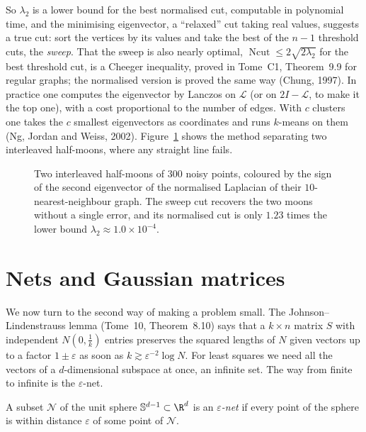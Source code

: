 So $\lambda_2$ is a lower bound for the best normalised cut, computable in polynomial time, and the minimising eigenvector, a ``relaxed'' cut
taking real values, suggests a true cut: sort the vertices by its values and take the best of the $n-1$ threshold cuts, the \emph{sweep}. That the sweep is
also nearly optimal, $\operatorname{Ncut}\le2\sqrt{2\lambda_2}$ for the best threshold cut, is a Cheeger inequality, proved in Tome~C1, Theorem~9.9 for regular graphs; the normalised version is
proved the same way (Chung, 1997). In practice one computes the eigenvector by Lanczos on $\mathcal L$ (or on $2I-\mathcal L$, to make it the top one), with a cost
proportional to the number of edges. With $c$ clusters one takes the $c$ smallest eigenvectors as coordinates and runs $k$-means on them (Ng, Jordan and Weiss, 2002).
Figure~\ref{fig:moons} shows the method separating two interleaved half-moons, where any straight line fails.

\begin{figure}[ht]
\centering
{}
\caption{Two interleaved half-moons of $300$ noisy points, coloured by the sign of the second eigenvector of the normalised Laplacian of their $10$-nearest-neighbour
graph. The sweep cut recovers the two moons without a single error, and its normalised cut is only $1.23$ times the lower bound $\lambda_2\approx1.0\times10^{-4}$.}
\label{fig:moons}
\end{figure}

\section{Nets and Gaussian matrices}\label{sec:nets}

We now turn to the second way of making a problem small. The Johnson--Lindenstrauss lemma (Tome~10, Theorem~8.10) says that a $k\times n$ matrix $S$ with independent
$N(0,\frac1k)$ entries preserves the squared lengths of $N$ given vectors up to a factor $1\pm\varepsilon$ as soon as $k\gtrsim\varepsilon^{-2}\log N$. For least squares we need
all the vectors of a $d$-dimensional subspace at once, an infinite set. The way from finite to infinite is the $\varepsilon$-net.

\begin{definition}\label{def:net}
A subset $\mathcal N$ of the unit sphere $\mathbb S^{d-1}\subset\R^d$ is an \emph{$\varepsilon$-net} if every point of the sphere is within distance $\varepsilon$ of some point of $\mathcal N$.
\end{definition}

